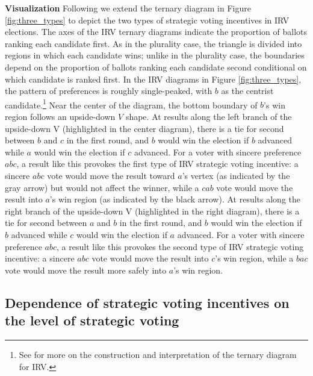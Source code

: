 \documentclass[11pt,a4paper]{article}
\begin{document}
\noindent \textbf{Visualization} Following \citet{eggersternary} we extend the ternary diagram in Figure \ref{fig:three_types} to depict the two types of strategic voting incentives in IRV elections. The axes of the IRV ternary diagrams indicate the proportion of ballots ranking each candidate first. As in the plurality case, the triangle is divided into regions in which each candidate wins; unlike in the plurality case, the boundaries depend on the proportion of ballots ranking each candidate second conditional on which candidate is ranked first. In the IRV diagrams in Figure \ref{fig:three_types}, the pattern of preferences is roughly single-peaked, with $b$ as the centrist candidate.\footnote{See \citet{eggersternary} for more on the construction and interpretation of the ternary diagram for IRV.} Near the center of the diagram, the bottom boundary of $b$'s win region follows an upside-down $V$ shape. At results along the left branch of the upside-down V (highlighted in the center diagram), there is a tie for second between $b$ and $c$ in the first round, and $b$ would win the election if $b$ advanced while $a$ would win the election if $c$ advanced. For a voter with sincere preference $abc$, a result like this provokes the first type of IRV strategic voting incentive: a sincere $abc$ vote would move the result toward $a$'s vertex (as indicated by the gray arrow) but would not affect the winner, while a $cab$ vote would move the result into $a$'s win region (as indicated by the black arrow). At results along the right branch of the upside-down V (highlighted in the right diagram), there is a tie for second between $a$ and $b$ in the first round, and $b$ would win the election if $b$ advanced while $c$ would win the election if $a$ advanced. For a voter with sincere preference $abc$, a result like this provokes the second type of IRV strategic voting incentive: a sincere $abc$ vote would move the result into $c$'s win region, while a $bac$ vote would move the result more safely into $a$'s win region. \\

\subsection{Dependence of strategic voting incentives on the level of strategic voting}
\end{document}
